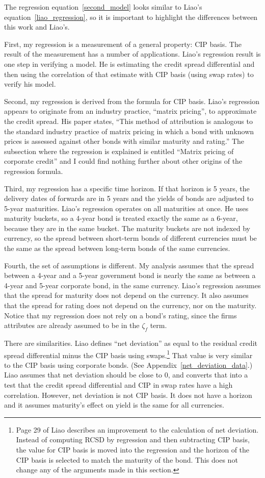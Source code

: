 The regression equation~\eqref{second_model} looks similar to Liao's equation~\eqref{liao_regression}, so it is important to highlight the differences between this work and Liao's.

First, my regression is a measurement of a general property: CIP basis.  The result of the measurement has a number of applications.  Liao's regression result is one step in verifying a model.  He is estimating the credit spread differential and then using the correlation of that estimate with CIP basis (using swap rates) to verify his model.  

Second, my regression is derived from the formula for CIP basis.  Liao's regression appears to originate from an industry practice, ``matrix pricing'', to approximate the credit spread.  His paper states, ``This method of attribution is analogous to the standard industry practice of matrix pricing in which a bond with unknown prices is assessed against other bonds with similar maturity and rating.''  The subsection where the regression is explained is entitled ``Matrix pricing of corporate credit'' and I could find nothing further about other origins of the regression formula.

Third, my regression has a specific time horizon.  If that horizon is 5 years, the delivery dates of forwards are in 5 years and the yields of bonds are adjusted to 5-year maturities.  Liao's regression operates on all maturities at once.  He uses maturity buckets, so a 4-year bond is treated exactly the same as a 6-year, because they are in the same bucket.  The maturity buckets are not indexed by currency, so the spread between short-term bonds of different currencies must be the same as the spread between long-term bonds of the same currencies.

Fourth, the set of assumptions is different.  My analysis assumes that the spread between a 4-year and a 5-year government bond is nearly the same as between a 4-year and 5-year corporate bond, in the same currency.  Liao's regression assumes that the spread for maturity does not depend on the currency.  It also assumes that the spread for rating does not depend on the currency, nor on the maturity.  Notice that my regression does not rely on a bond's rating, since the firms attributes are already assumed to be in the $\zeta_f$ term.

There are similarities.  Liao defines ``net deviation'' as equal to the residual credit spread differential minus the CIP basis using swaps.\footnote{Page 29 of Liao\cite{Liao2016} describes an improvement to the calculation of net deviation.  Instead of computing RCSD by regression and then subtracting CIP basis, the value for CIP basis is moved into the regression and the horizon of the CIP basis is selected to match the maturity of the bond.  This does not change any of the arguments made in this section.}  That value is very similar to the CIP basis using corporate bonds.  (See Appendix~\ref{net_deviation_data}.)  Liao assumes that net deviation should be close to 0, and converts that into a test that the credit spread differential and CIP in swap rates have a high correlation.  However, net deviation is not CIP basis.  It does not have a horizon and it assumes maturity's effect on yield is the same for all currencies.

